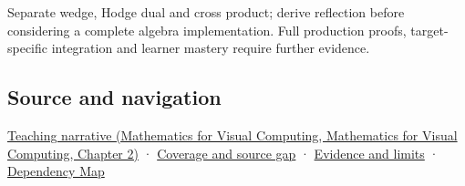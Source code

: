 Separate wedge, Hodge dual and cross product; derive reflection before considering a complete algebra implementation. Full production proofs, target-specific integration and learner mastery require further evidence.

\subsection{Source and navigation}\label{appendix-e1960925d1b8-source-and-navigation}

\href{../02-Mathematics-for-Visual-Computing/main.pdf\#nameddest=01-foundations-i-ch018-oriented-areas-deserve-their-own-representation}{Teaching narrative (Mathematics for Visual Computing, Mathematics for Visual Computing, Chapter 2)} · \hyperref[appendix-fd090d982a15-phase-6---parts-501-600]{Coverage and source gap} · \hyperref[appendix-a103e7846d21-phase-6---source-analysis-and-verification]{Evidence and limits} · \hyperref[appendix-4ad47bdd269a]{Dependency Map}
